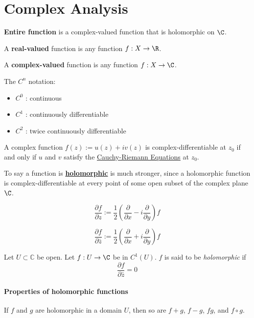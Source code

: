 \section{Complex Analysis}\label{f28d4dc}

\label{d508dc8}

\textbf{Entire function} is a complex-valued function that is holomorphic on $\C$.

A \textbf{real-valued} function is any function $f:X\to\R$.

A \textbf{complex-valued} function is any function $f:X\to\C$.

The $C^n$ notation:
\begin{itemize}
	\item $C^0$ : continuous
	\item $C^1$ : continuously differentiable
	\item $C^2$ : twice continuously differentiable
\end{itemize}

\label{d1d5d93}

A complex function $f(z):=u(z)+iv(z)$ is complex-differentiable at
$z_0$ if and only if $u$ and $v$ satisfy the
\href{fb10fd3}{Cauchy-Riemann Equations} at $z_0$.

To say a function is \href{e1e08f7}{\textbf{holomorphic}} is much
stronger, since a holomorphic function is complex-differentiable at
every point of some open subset of the complex plane $\C$.

\label{ffea0ed}

$$
	\frac{\partial f}{\partial z} :=
	\frac12\left(
	\frac{\partial}{\partial x}-i\frac{\partial}{\partial y}
	\right)f
$$

$$
	\frac{\partial f}{\partial\bar z} :=
	\frac12\left(
	\frac{\partial}{\partial x}+i\frac{\partial}{\partial y}
	\right)f
$$

\label{e1e08f7}

Let $U\subset\mathbb C$ be open. Let $f:U\to\C$ be in $C^1(U)$. $f$ is
said to be \textit{holomorphic} if
$$
	\frac{\partial f}{\partial\bar z}=0
$$

\paragraph{Properties of holomorphic functions} If $f$ and $g$ are
holomorphic in a domain $U$, then so are $f+g$, $f-g$, $fg$, and
$f\circ g$.

